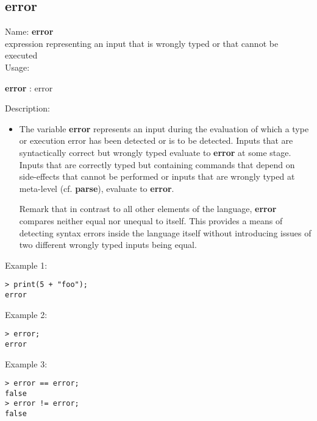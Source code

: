 \subsection{error}
\label{laberror}
\noindent Name: \textbf{error}\\
expression representing an input that is wrongly typed or that cannot be executed\\
\noindent Usage: 
\begin{center}
\textbf{error} : \textsf{error}\\
\end{center}
\noindent Description: \begin{itemize}

\item The variable \textbf{error} represents an input during the evaluation of
   which a type or execution error has been detected or is to be
   detected. Inputs that are syntactically correct but wrongly typed
   evaluate to \textbf{error} at some stage.  Inputs that are correctly typed
   but containing commands that depend on side-effects that cannot be
   performed or inputs that are wrongly typed at meta-level (cf. \textbf{parse}),
   evaluate to \textbf{error}.
    
   Remark that in contrast to all other elements of the \sollya language,
   \textbf{error} compares neither equal nor unequal to itself. This provides a
   means of detecting syntax errors inside the \sollya language itself
   without introducing issues of two different wrongly typed inputs being
   equal.
\end{itemize}
\noindent Example 1: 
\begin{center}\begin{minipage}{15cm}\begin{Verbatim}[frame=single]
> print(5 + "foo");
error
\end{Verbatim}
\end{minipage}\end{center}
\noindent Example 2: 
\begin{center}\begin{minipage}{15cm}\begin{Verbatim}[frame=single]
> error;
error
\end{Verbatim}
\end{minipage}\end{center}
\noindent Example 3: 
\begin{center}\begin{minipage}{15cm}\begin{Verbatim}[frame=single]
> error == error;
false
> error != error;
false
\end{Verbatim}
\end{minipage}\end{center}
